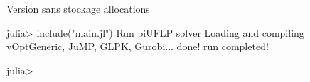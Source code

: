 Version sans stockage allocations

julia> include("main.jl")
Run biUFLP solver
Loading and compiling vOptGeneric, JuMP, GLPK, Gurobi... done!
run completed! 

julia> 